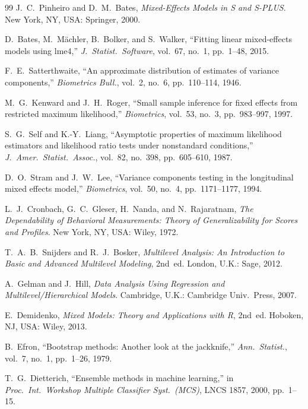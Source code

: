 \documentclass{ieeeaccess}
\theoremstyle{definition}
\theoremstyle{plain}
\begin{document}
\begin{thebibliography}{99}
 J.~C.~Pinheiro and D.~M.~Bates, \emph{Mixed-Effects
Models in S and S-PLUS}. New York, NY, USA: Springer, 2000.

 D.~Bates, M.~M\"{a}chler, B.~Bolker, and S.~Walker,
``Fitting linear mixed-effects models using lme4,'' \emph{J.\ Statist.\
Software}, vol.~67, no.~1, pp.~1--48, 2015.

 F.~E.~Satterthwaite, ``An approximate distribution
of estimates of variance components,'' \emph{Biometrics Bull.}, vol.~2, no.~6,
pp.~110--114, 1946.

 M.~G.~Kenward and J.~H.~Roger, ``Small sample inference
for fixed effects from restricted maximum likelihood,'' \emph{Biometrics},
vol.~53, no.~3, pp.~983--997, 1997.

 S.~G.~Self and K.-Y.~Liang, ``Asymptotic properties of
maximum likelihood estimators and likelihood ratio tests under nonstandard
conditions,'' \emph{J.\ Amer.\ Statist.\ Assoc.}, vol.~82, no.~398,
pp.~605--610, 1987.

 D.~O.~Stram and J.~W.~Lee, ``Variance components testing in
the longitudinal mixed effects model,'' \emph{Biometrics}, vol.~50, no.~4,
pp.~1171--1177, 1994.

 L.~J.~Cronbach, G.~C.~Gleser, H.~Nanda, and
N.~Rajaratnam, \emph{The Dependability of Behavioral Measurements: Theory of
Generalizability for Scores and Profiles}. New York, NY, USA: Wiley, 1972.

 T.~A.~B.~Snijders and R.~J.~Bosker, \emph{Multilevel
Analysis: An Introduction to Basic and Advanced Multilevel Modeling}, 2nd~ed.
London, U.K.: Sage, 2012.

 A.~Gelman and J.~Hill, \emph{Data Analysis Using
Regression and Multilevel/Hierarchical Models}. Cambridge, U.K.: Cambridge
Univ.\ Press, 2007.

 E.~Demidenko, \emph{Mixed Models: Theory and
Applications with R}, 2nd~ed. Hoboken, NJ, USA: Wiley, 2013.

 B.~Efron, ``Bootstrap methods: Another look at the
jackknife,'' \emph{Ann.\ Statist.}, vol.~7, no.~1, pp.~1--26, 1979.

 T.~G.~Dietterich, ``Ensemble methods in machine
learning,'' in \emph{Proc.\ Int.\ Workshop Multiple Classifier Syst.\ (MCS)},
LNCS 1857, 2000, pp.~1--15.


\end{thebibliography}
\end{document}
